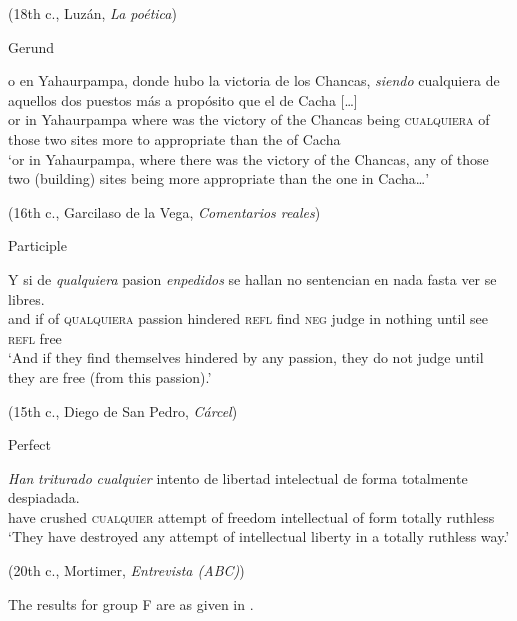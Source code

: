    (18th c., Luzán, \textit{La poética})
    
\ex \label{ex:key:277-5} Gerund

    \gll […] o en Yahaurpampa, donde hubo la victoria de los Chancas, \textit{siendo} {cualquiera} de aquellos dos puestos más a propósito que el de Cacha […]\\
{} or in Yahaurpampa where was the victory of the Chancas being \textsc{cualquiera} of those two sites more to appropriate than the of Cacha\\ 
    \glt ‘or in Yahaurpampa, where there was the victory of the Chancas, any of those two (building) sites being more appropriate than the one in Cacha…’

    (16th c., Garcilaso de la Vega, \textit{Comentarios reales})
    
\ex \label{ex:key:277-6} Participle

    \gll Y si de \textit{qualquiera} pasion \textit{enpedidos} se hallan no sentencian en nada fasta ver se libres.\\
and if of \textsc{qualquiera} passion hindered \textsc{refl} find \textsc{neg} judge in nothing until see \textsc{refl} free\\
\glt ‘And if they find themselves hindered by any passion, they do not judge until they are free (from this passion).’

    (15th c., Diego de San Pedro, \textit{Cárcel})
    
\ex \label{ex:key:277-7} Perfect

    \gll \textit{Han} \textit{triturado} \textit{cualquier} intento de libertad intelectual de forma totalmente despiadada.\\
have crushed \textsc{cualquier} attempt of freedom intellectual of form totally ruthless\\
    \glt ‘They have destroyed any attempt of intellectual liberty in a totally ruthless way.’

    (20th c., Mortimer, \textit{Entrevista (ABC)})
\z
\z

The results for group F are as given in .

